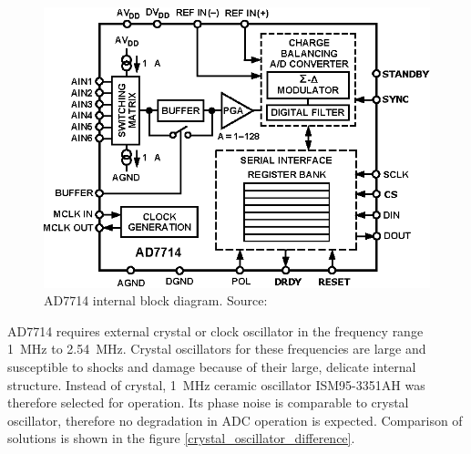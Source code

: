         \begin{figure}[H]
            \centering
            \includegraphics[width=0.7\paperwidth]{img/06/AD7714.eps}
            \caption{AD7714 internal block diagram. Source: \cite{AD7714_datasheet}}
            \label{AD7714}
        \end{figure}

        AD7714 requires external crystal or clock oscillator in the frequency range \SI{1}{\mega\hertz} to \SI{2.54}{\mega\hertz}. Crystal oscillators for these frequencies are large and susceptible to shocks and damage because of their large, delicate internal structure. Instead of crystal, \SI{1}{\mega\hertz} ceramic oscillator ISM95-3351AH was therefore selected for operation. Its phase noise is comparable to crystal oscillator, therefore no degradation in ADC operation is expected. Comparison of solutions is shown in the figure \ref{crystal_oscillator_difference}.

